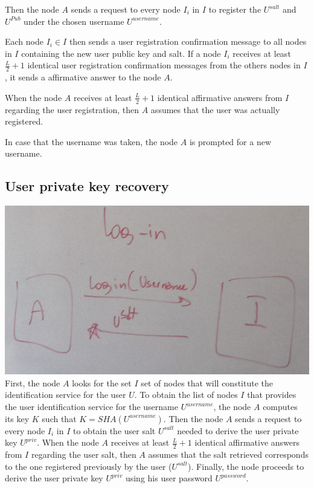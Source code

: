 Then the node $A$ sends a request to every node $I_i$ in $I$ to register the
$U^{salt}$ and $U^{Pub}$ under the chosen  username  $U^{username}$.

Each node $I_i \in I$ then sends a user registration confirmation message to all nodes
in $I$ containing the new user public key and salt. If a node $I_i$ receives at
least $\frac{L}{2} + 1$ identical user registration confirmation messages from
the others nodes in $I$, it sends a affirmative answer to the node $A$.

When the node
$A$ receives at least $\frac{L}{2} + 1$ identical affirmative answers from
$I$ regarding the user registration, then $A$ assumes that the user was
actually registered.

In case that the username was taken,
the node $A$ is prompted for a new username.



\subsection{User private key recovery}
\label{sec:private_key_recovery}
\includegraphics[width=14cm]{../img/login_protocol_mockup}\\

First, the node $A$ looks for the set $I$ set of nodes that will constitute the
identification service for the user $U$.
To obtain the list of nodes $I$ that provides the user identification service for
the username $U^{username}$, the node $A$ computes its key $K$ such that $K =
SHA(U^{username})$. 
Then the node $A$ sends a request to every node $I_i$ in $I$ to obtain the user
salt $U^{salt}$ needed to derive the user private key $U^{priv}$.
 When the node $A$ receives at least $\frac{L}{2} + 1$ identical affirmative answers from
$I$ regarding the user salt, then $A$ assumes that the salt retrieved
corresponds to the one registered previously by the user ($U^{salt}$). Finally,
the node proceeds to derive the user private key $U^{priv}$ using his user password $U^{password}$.

